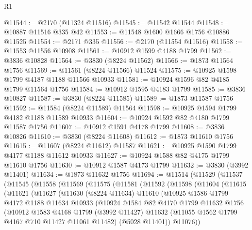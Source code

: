 \begin{lexlean}{R1}
\begin{coremodule}
@11544 := @2170 (@11324 @11516)
@11545 := @11542 @11544
@11548 := @10887 @11516 @335 @42
@11553 := @11548 @1600 @1666 @1756 @10886 @11525
@11554 := @2171 @335
@11556 := @2170 (@11554 @11516)
@11558 := @11553 @11556 @10908
@11561 := @10912 @1599 @4188 @1799
@11562 := @3836 @10828
@11564 := @3830 (@8224 @11562)
@11566 := @1873 @11564 @1756
@11569 := @11561 (@8224 @11566) @11524
@11575 := @10925 @1598 @1799 @4187 @1188 @11566 @10933
@11581 := @10924 @1596 @82 @4185 @1799 @11564 @1756
@11584 := @10912 @1595 @4183 @1799
@11585 := @3836 @10827
@11587 := @3830 (@8224 @11585)
@11589 := @1873 @11587 @1756
@11592 := @11584 (@8224 @11589) @11564
@11598 := @10925 @1594 @1799 @4182 @1188 @11589 @10933
@11604 := @10924 @1592 @82 @4180 @1799 @11587 @1756
@11607 := @10912 @1591 @4178 @1799
@11608 := @3836 @10826
@11610 := @3830 (@8224 @11608)
@11612 := @1873 @11610 @1756
@11615 := @11607 (@8224 @11612) @11587
@11621 := @10925 @1590 @1799 @4177 @1188 @11612 @10933
@11627 := @10924 @1588 @82 @4175 @1799 @11610 @1756
@11630 := @10912 @1587 @4173 @1799
@11632 := @3830 (@3992 @11401)
@11634 := @1873 @11632 @1756
@11694 := @11514
    (@11529
      (@11537
        (@11545
          (@11558
            (@11569
              (@11575
                (@11581
                  (@11592
                    (@11598
                      (@11604
                        (@11615
                          (@11621
                            (@11627
                              (@11630
                                (@8224 @11634)
                                @11610
                                (@10925
                                  @1586
                                  @1799
                                  @4172
                                  @1188
                                  @11634
                                  @10933
                                  (@10924
                                    @1584
                                    @82
                                    @4170
                                    @1799
                                    @11632
                                    @1756
                                    (@10912
                                      @1583
                                      @4168
                                      @1799
                                      (@3992 @11427)
                                      @11632
                                      (@11055 @1562 @1799 @4167 @710 @11427 @11061 @11482)
                                      (@5028 @11401))
                                    @11076))

\end{coremodule}
\end{lexlean}
